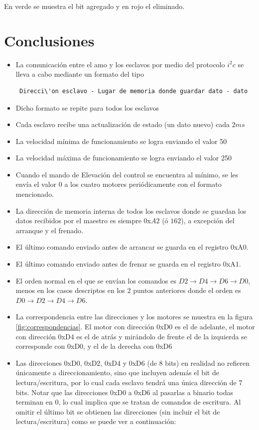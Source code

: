 \documentclass[main]{subfiles}
\begin{document}
En verde se muestra el bit agregado y en rojo el eliminado.

\section{Conclusiones}
\label{sec:conclu}

\begin{itemize}
\item La comunicaci\'on entre el amo y los esclavos por medio del protocolo $i^2c$ se lleva a cabo mediante un  formato del tipo \begin{verbatim} Direcci\'on esclavo - Lugar de memoria donde guardar dato - dato \end{verbatim}
\item Dicho formato se repite para todos los esclavos
\item Cada esclavo recibe una actualizaci\'on de estado (un dato nuevo) cada $2 ms$
\item La velocidad m\'inima de funcionamiento se logra enviando el valor 50
\item La velocidad m\'axima de funcionamiento se logra enviando el valor 250
\item Cuando el mando de Elevaci\'on del control se encuentra al m\'inimo, se les env\'ia el valor 0 a los cuatro motores peri\'odicamente con el formato mencionado.
\item La direcci\'on de memoria interna de todos los esclavos donde se guardan los datos recibidos por el maestro es siempre 0x$A2$ (\'o $162$), a excepci\'on del arranque y el frenado.
\item El \'ultimo comando enviado antes de arrancar se guarda en el registro 0xA0.
\item El \'ultimo comando enviado antes de frenar se guarda en el registro 0xA1.
\item El orden normal en el que se env\'ian los comandos es $D2\rightarrow D4\rightarrow D6\rightarrow D0$, menos en los casos descriptos en los 2 puntos anteriores donde el orden es $D0\rightarrow D2\rightarrow D4\rightarrow D6$.
\item La correspondencia entre las direcciones y los motores se muestra en la figura \ref{fig:correspondencias}. El motor con direcci\'on 0xD0 es el de adelante, el motor con direcci\'on 0xD4 es el de atr\'as y mir\'andolo de frente el de la izquierda se corresponde con 0xD0, y el de la derecha con 0xD6
\item Las direcciones 0xD0, 0xD2, 0xD4 y 0xD6 (de 8 bits) en realidad no refieren \'unicamente a direccionamiento, sino que incluyen adem\'as el bit de lectura/escritura, por lo cual cada esclavo tendr\'a una \'unica direcci\'on de 7 bits. Notar que las direcciones 0xD0 a 0xD6 al pasarlas a binario todas terminan en 0, lo cual implica que se tratan de comandos de escritura. Al omitir el \'ultimo bit se obtienen las direcciones (sin incluir el bit de lectura/escritura) como se puede ver a continuaci\'on:

\end{itemize}
\end{document}
